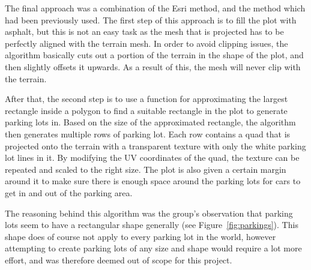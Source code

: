 The final approach was a combination of the Esri method, and the method which had been previously used. 
The first step of this approach is to fill the plot with asphalt, but this is not an easy task as the mesh that is projected has to be perfectly aligned with the terrain mesh.
In order to avoid clipping issues, the algorithm basically cuts out a portion of the terrain in the shape of the plot, and then slightly offsets it upwards.
As a result of this, the mesh will never clip with the terrain. 

After that, the second step is to use a function for approximating the largest rectangle inside a polygon to find a suitable rectangle in the plot to generate parking lots in.
Based on the size of the approximated rectangle, the algorithm then generates multiple rows of parking lot.
Each row contains a quad that is projected onto the terrain with a transparent texture with only the white parking lot lines in it.
By modifying the UV coordinates of the quad, the texture can be repeated and scaled to the right size.
The plot is also given a certain margin around it to make sure there is enough space around the parking lots for cars to get in and out of the parking area.

The reasoning behind this algorithm was the group's observation that parking lots seem to have a rectangular shape generally (see Figure~\ref{fig:parkings}).
This shape does of course not apply to every parking lot in the world, however attempting to create parking lots of any size and shape would require a lot more effort, and was therefore deemed out of scope for this project. 

